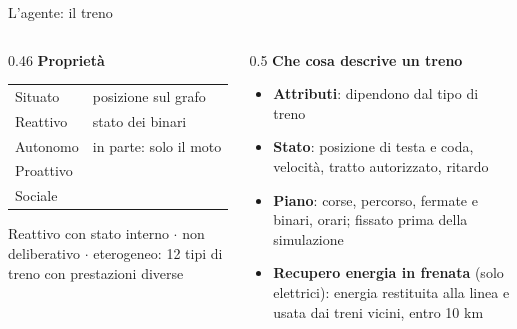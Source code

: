 \documentclass[11pt,aspectratio=169]{beamer}
\begin{document}
\begin{frame}{L'agente: il treno}
	\begin{columns}[T]
		\begin{column}{0.46\textwidth}
			\textbf{\color{mrsAzzurro}Proprietà}\par\medskip
			\begin{tabular}{@{}ll@{}}
				\toprule
				Situato & \si{} posizione sul grafo \\
				Reattivo & \si{} stato dei binari \\
				Autonomo & in parte: solo il moto \\
				Proattivo & \no{} \\
				Sociale & \no{} \\
				\bottomrule
			\end{tabular}
			\begin{alertblock}{}
				Reattivo con stato interno $\cdot$ non deliberativo $\cdot$ eterogeneo: 12 tipi di treno con prestazioni diverse
			\end{alertblock}
		\end{column}
		\begin{column}{0.5\textwidth}
			\textbf{\color{mrsAzzurro}Che cosa descrive un treno}
			\begin{itemize}
				\item \textbf{Attributi}: dipendono dal tipo di treno
				\item \textbf{Stato}: posizione di testa e coda, velocità, tratto autorizzato, ritardo
				\item \textbf{Piano}: corse, percorso, fermate e binari, orari; fissato prima della simulazione
				\item \textbf{Recupero energia in frenata} (solo elettrici): energia restituita alla linea e usata dai treni vicini, entro 10 km
			\end{itemize}
		\end{column}
	\end{columns}
\end{frame}
\end{document}
